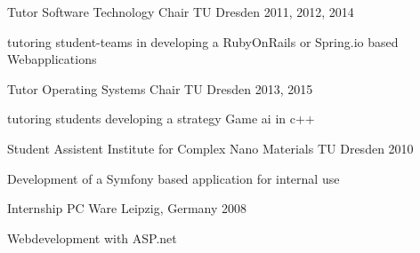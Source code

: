 \begin{cventries}

  \cventry
    {Tutor}
    {Software Technology Chair}
    {TU Dresden}
    {2011, 2012, 2014}
    {
      \begin{cvitems}
      \item[] {tutoring student-teams in developing a RubyOnRails or Spring.io based Webapplications}
      \end{cvitems}
    }

  \cventry
    {Tutor}
    {Operating Systems Chair}
    {TU Dresden}
    {2013, 2015}
    {
      \begin{cvitems}
      \item[] {tutoring students developing a strategy Game ai in c++}
      \end{cvitems}
    }

  \cventry
    {Student Assistent}
    {Institute for Complex Nano Materials}
    {TU Dresden}
    {2010}
    {
      \begin{cvitems}
      \item[] {Development of a Symfony based application for internal use}
      \end{cvitems}
    }

  \cventry
    {Internship}
    {PC Ware}
    {Leipzig, Germany}
    {2008}
    {
      \begin{cvitems}
      \item {Webdevelopment with ASP.net}
      \end{cvitems}
    }

\end{cventries}
